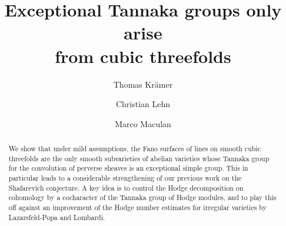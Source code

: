 \documentclass[a4paper]{amsart}
\renewcommand{\ss}{\textup{ss}}
\theoremstyle{plain}
\theoremstyle{definition}
\numberwithin{equation}{section}
\begin{document}
\author[T. Kr\"amer]{Thomas Kr\"amer}
\address{Thomas Kr\"amer \\
	Fakult\"{a}t f\"{u}r Mathematik\\
	Technische Universit\"{a}t Chemnitz\\
	Rei\-chenhainer Stra\ss e 39, 09126 Chemnitz\\
	Germany.}

\author[C. Lehn]{Christian Lehn}
\address{Christian Lehn\\ 
Fakult\"at f\"ur Mathematik\\Ruhr-Universit\"at Bochum\\ 
Universit\"ats\-stra\ss e~150\\
Postfach IB 45\\
44801 Bochum, Germany}

\author[M. Maculan]{Marco Maculan}
\address{Marco Maculan \\
Institut de Math\'ematiques de Jussieu \\
Sorbonne Universit\'e \\
4 place Jussieu \\
75005 Paris \\
France}

\title[Exceptional Tannaka groups only arise from cubic threefolds]{Exceptional Tannaka groups only arise\\ from cubic threefolds}




\begin{abstract}
We show that under mild assumptions, the Fano surfaces of lines on smooth cubic threefolds are the only smooth subvarieties of abelian varieties whose Tannaka group for the convolution of perverse sheaves is an exceptional simple group. This in particular leads to a considerable strengthening of our previous work on the Shafarevich conjecture. A key idea is to control the Hodge decomposition on cohomology by a cocharacter of the Tannaka group of Hodge modules, and to play this off against an improvement of the Hodge number estimates for irregular varieties by Lazarsfeld-Popa and Lombardi. 
\end{abstract}
\end{document}
